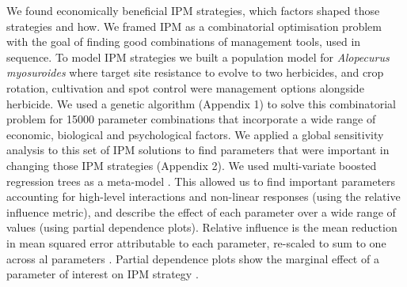 \documentclass[9pt,twocolumn,twoside,lineno]{pnas-new}
\begin{document}
We found economically beneficial IPM strategies, which factors shaped those strategies and how. We framed IPM as a combinatorial optimisation problem with the goal of finding good combinations of management tools, used in sequence. To model IPM strategies we built a population model for \textit{Alopecurus myosuroides} where target site resistance to evolve to two herbicides, and crop rotation, cultivation and spot control were management options alongside herbicide. We used a genetic algorithm (Appendix 1) to solve this combinatorial problem \citep{Tayl2004GA, Carr2010} for 15000 parameter combinations that incorporate a wide range of economic, biological and psychological factors. We applied a global sensitivity analysis to this set of IPM solutions to find parameters that were important in changing those IPM strategies (Appendix 2). We used multi-variate boosted regression trees \citep{Mill2016} as a meta-model \citep{Cout2013}. This allowed us to find important parameters accounting for high-level interactions and non-linear responses (using the relative influence metric), and describe the effect of each parameter over a wide range of values (using partial dependence plots). Relative influence is the mean reduction in mean squared error attributable to each parameter, re-scaled to sum to one across al parameters \citep{Frie2001, Mill2016}. Partial dependence plots show the marginal effect of a parameter of interest on IPM strategy \citep{Frie2001, Mill2016}.         
\end{document}
